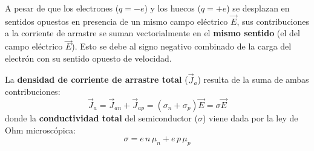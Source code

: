\begin{concepto}
A pesar de que los electrones ($q = -e$) y los huecos ($q = +e$) se desplazan en sentidos opuestos en presencia de un mismo campo eléctrico $\vec{E}$, sus contribuciones a la corriente de arrastre se suman vectorialmente en el \textbf{mismo sentido} (el del campo eléctrico $\vec{E}$). Esto se debe al signo negativo combinado de la carga del electrón con su sentido opuesto de velocidad.
\end{concepto}

La \textbf{densidad de corriente de arrastre total} ($\vec{J}_a$) resulta de la suma de ambas contribuciones:
\[
\vec{J}_a = \vec{J}_{an} + \vec{J}_{ap} = (\sigma_n + \sigma_p) \vec{E} = \sigma \vec{E}
\]
donde la \textbf{conductividad total} del semiconductor ($\sigma$) viene dada por la ley de Ohm microscópica:
\[
\sigma = e \, n \, \mu_n + e \, p \, \mu_p
\]

